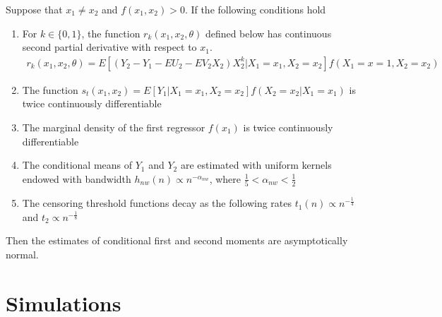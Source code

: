 \begin{theorem} Suppose that $x_1 \neq x_2$ and $f(x_1, x_2) > 0$. If the following conditions hold
  \begin{enumerate}
    \item For $k \in \{0, 1\}$, the function $r_{k}(x_1, x_2, \theta)$ defined below has continuous second partial derivative with respect to $x_1$.
    \begin{align}
      r_{k}(x_1, x_2, \theta) = E[(Y_2  - Y_1 - EU_2 - EV_2X_2)X_2^{k} | X_1 = x_1, X_2 = x_2]f(X_1 = x=1, X_2 = x_2)
    \end{align}
    \item The function $s_t(x_1, x_2) = E[Y_1 | X_1 = x_1, X_2 = x_2]f(X_2 = x_2 | X_1 = x_1)$ is twice continuously differentiable
    \item The marginal density of the first regressor $f(x_1)$ is twice continuously differentiable
    \item The conditional means of $Y_{1}$ and $Y_{2}$ are estimated with uniform kernels endowed with bandwidth $h_{nw}(n) \propto n^{-\alpha_{nw}}$, where $\frac{1}{5} < \alpha_{nw} < \frac{1}{2}$
    \item The censoring threshold functions decay as the following rates $t_1(n) \propto n^{-\frac{1}{4}}$ and $t_2 \propto n^{-\frac{1}{8}}$
  \end{enumerate}
\noindent 
Then the estimates of conditional first and second moments are asymptotically normal.
\end{theorem}





\section{Simulations} \label{sec:simulation}

